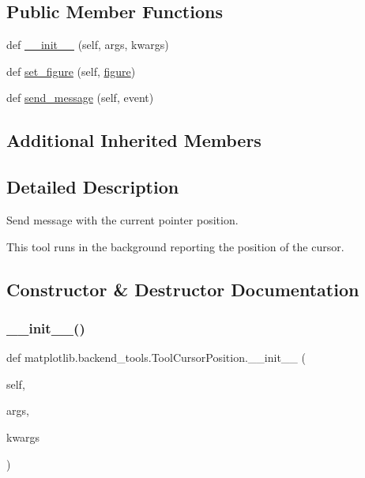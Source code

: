 \subsection*{Public Member Functions}
\begin{DoxyCompactItemize}
\item 
def \hyperlink{classmatplotlib_1_1backend__tools_1_1ToolCursorPosition_ab8cb915d811bab8fbfa903ae6d7e603f}{\+\_\+\+\_\+init\+\_\+\+\_\+} (self, args, kwargs)
\item 
def \hyperlink{classmatplotlib_1_1backend__tools_1_1ToolCursorPosition_a6b4f8619f49005745e0b806969268702}{set\+\_\+figure} (self, \hyperlink{classmatplotlib_1_1backend__tools_1_1ToolBase_af85e83d1db0787aa40d06837204651ee}{figure})
\item 
def \hyperlink{classmatplotlib_1_1backend__tools_1_1ToolCursorPosition_a5c7c58be414505ed62aff0aff1155e7a}{send\+\_\+message} (self, event)
\end{DoxyCompactItemize}
\subsection*{Additional Inherited Members}


\subsection{Detailed Description}
\begin{DoxyVerb}Send message with the current pointer position.

This tool runs in the background reporting the position of the cursor.
\end{DoxyVerb}
 

\subsection{Constructor \& Destructor Documentation}
\mbox{\label{classmatplotlib_1_1backend__tools_1_1ToolCursorPosition_ab8cb915d811bab8fbfa903ae6d7e603f}} 
\subsubsection{\texorpdfstring{\+\_\+\+\_\+init\+\_\+\+\_\+()}{\_\_init\_\_()}}
{\footnotesize\ttfamily def matplotlib.\+backend\+\_\+tools.\+Tool\+Cursor\+Position.\+\_\+\+\_\+init\+\_\+\+\_\+ (\begin{DoxyParamCaption}\item[{}]{self,  }\item[{}]{args,  }\item[{}]{kwargs }\end{DoxyParamCaption})}



